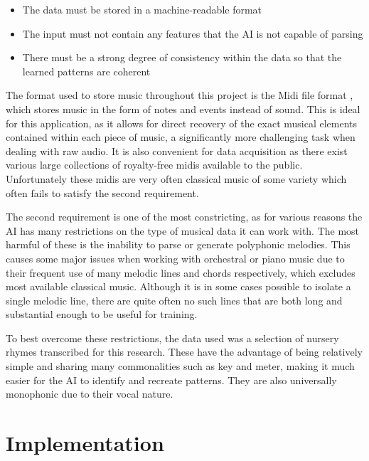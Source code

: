 \documentclass[ author={Stephen Livermore-Tozer},
				supervisor={Dr. Peter Flach},
				degree={MEng},
				title={Performing Algorithmic Co-composition Using Machine Learning},
				subtitle={},
				type={research},
				year={2016} ]{dissertation}
\begin{document}
	\begin{itemize}
		\item The data must be stored in a machine-readable format
		\item The input must not contain any features that the AI is not capable of parsing
		\item There must be a strong degree of consistency within the data so that the learned patterns are coherent
	\end{itemize}
	
	The format used to store music throughout this project is the Midi file format \cite{swift1997brief}, which stores music in the form of notes and events instead of sound. This is ideal for this application, as it allows for direct recovery of the exact musical elements contained within each piece of music, a significantly more challenging task when dealing with raw audio. It is also convenient for data acquisition as there exist various large collections of royalty-free midis available to the public. Unfortunately these midis are very often classical music of some variety which often fails to satisfy the second requirement.
	
	The second requirement is one of the most constricting, as for various reasons the AI has many restrictions on the type of musical data it can work with. %
	The most harmful of these is the inability to parse or generate polyphonic melodies. This causes some major issues when working with orchestral or piano music due to their frequent use of many melodic lines and chords respectively, which excludes most available classical music. Although it is in some cases possible to isolate a single melodic line, there are quite often no such lines that are both long and substantial enough to be useful for training.
	
	To best overcome these restrictions, the data used was a selection of nursery rhymes transcribed for this research. These have the advantage of being relatively simple and sharing many commonalities such as key and meter, making it much easier for the AI to identify and recreate patterns. They are also universally monophonic due to their vocal nature.
	
	\section{Implementation}
	
		
	\backmatter
	
	
	
\end{document}
